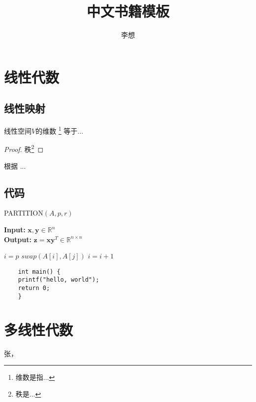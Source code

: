 \documentclass[oneside]{ctexbook}
\title{\Huge \textbf{中文书籍模板}}
\author{\huge 李想}
\date{}
\newtheorem{theorem}{定理}[chapter]
\begin{document}
\maketitle

\tableofcontents
\newpage

\setcounter{page}{1}

\chapter{线性代数}
\section{线性映射}

\begin{tcolorbox}
[colframe=cyan!40!black,
title={\begin{theorem}
[秩-零化度]\end{theorem}}]
线性空间$V$的维数
\footnote{维数是指...}
等于...
\end{tcolorbox}
    
\begin{proof}
    秩\footnote{秩是...}
\end{proof}
根据 ...\cite{ref1}

\newpage

\section{代码}
\begin{algorithm}[!h]
	\caption{PARTITION$(A,p,r)$}%
	\textbf{Input: }{$\mathbf{x},
    \mathbf{y}\in\mathbb{R}^n$}\\
    \textbf{Output:}
    {$\mathbf{z}=\mathbf{x}
    \mathbf{y}^T\in\mathbb{R}^{n\times n}$}
    \begin{algorithmic}[1]%
		\STATE $i=p$
		\STATE $swap(A[i],A[j])$
		\STATE $i=i+1$
		\ENDIF
		\ENDFOR
    \end{algorithmic}
\end{algorithm}

\begin{verbatim}
    int main() {
    printf("hello, world");
    return 0;
    }
\end{verbatim}

\newpage

\appendix
\renewcommand{\appendixname}{附录\Alph{section}}
\chapter{多线性代数}
\newpage

\begin{thebibliography}{99}
    张，
\end{thebibliography}
\end{document}
